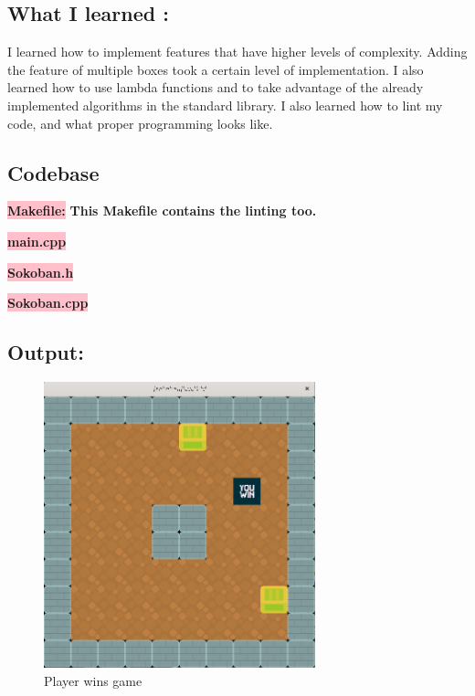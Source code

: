 \subsection{What I learned :}\label{sec:ps2b:learn}
I learned how to implement features that have higher levels of complexity. Adding the feature of multiple boxes took a certain level of implementation. I also learned how to use lambda functions and to take advantage of the already implemented algorithms in the standard library. I also learned how to lint my code, and what proper programming looks like. 

\newpage
\subsection{Codebase}\label{sec:ps2b:code}

\colorbox{pink}{\textbf{Makefile:}} \newline \textbf{This Makefile contains the linting too.}



\colorbox{pink}{\textbf{main.cpp}} 

\colorbox{pink}{\textbf{Sokoban.h}} 


\colorbox{pink}{\textbf{Sokoban.cpp}} 




\subsection{Output:}\label{sec:ps2b:output}
\begin{figure}[h]
    \centering
    \includegraphics[width=0.7\textwidth]{projectPictures/PS2b.png}
    \caption{Player wins game}
    \label{fig:ps2b}
\end{figure}

